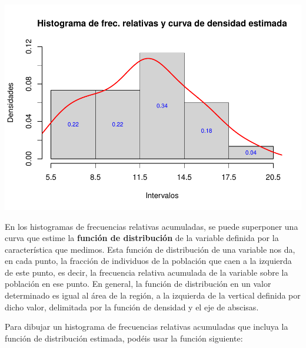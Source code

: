 \documentclass[
]{book}
\theoremstyle{definition}
\theoremstyle{definition}
\theoremstyle{definition}
\theoremstyle{remark}
\begin{document}
\begin{center}\includegraphics[width=0.9\linewidth]{13chap13_Agrupados_files/figure-latex/unnamed-chunk-82-1} \end{center}

En los histogramas de frecuencias relativas acumuladas, se puede superponer una curva que estime la \textbf{función de distribución} de la variable definida por la característica que medimos. Esta función de distribución de una variable nos da, en cada punto, la fracción de individuos de la población que caen a la izquierda de este punto, es decir, la frecuencia relativa acumulada de la variable sobre la población en ese punto. En general, la función de distribución en un valor determinado es igual al área de la región, a la izquierda de la vertical definida por dicho valor, delimitada por la función de densidad y el eje de abscisas.

Para dibujar un histograma de frecuencias relativas acumuladas que incluya la función de distribución estimada, podéis usar la función siguiente:
\end{document}
